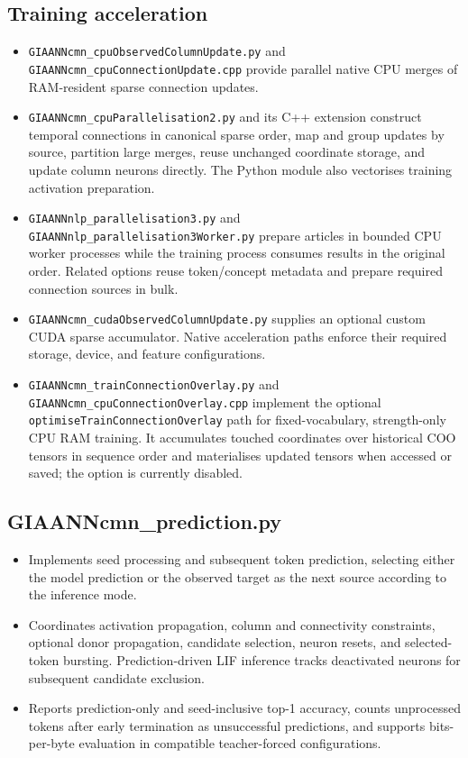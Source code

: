 \subsection{Training acceleration}
\begin{itemize}
	\item \texttt{GIAANNcmn\_cpuObservedColumnUpdate.py} and \texttt{GIAANNcmn\_cpuConnectionUpdate.cpp} provide parallel native CPU merges of RAM-resident sparse connection updates.
	\item \texttt{GIAANNcmn\_cpuParallelisation2.py} and its C++ extension construct temporal connections in canonical sparse order, map and group updates by source, partition large merges, reuse unchanged coordinate storage, and update column neurons directly. The Python module also vectorises training activation preparation.
	\item \texttt{GIAANNnlp\_parallelisation3.py} and \texttt{GIAANNnlp\_parallelisation3Worker.py} prepare articles in bounded CPU worker processes while the training process consumes results in the original order. Related options reuse token/concept metadata and prepare required connection sources in bulk.
	\item \texttt{GIAANNcmn\_cudaObservedColumnUpdate.py} supplies an optional custom CUDA sparse accumulator. Native acceleration paths enforce their required storage, device, and feature configurations.
	\item \texttt{GIAANNcmn\_trainConnectionOverlay.py} and \texttt{GIAANNcmn\_cpuConnectionOverlay.cpp} implement the optional \texttt{optimiseTrainConnectionOverlay} path for fixed-vocabulary, strength-only CPU RAM training. It accumulates touched coordinates over historical COO tensors in sequence order and materialises updated tensors when accessed or saved; the option is currently disabled.
\end{itemize}

\subsection{GIAANNcmn\_prediction.py}
\begin{itemize}
	\item Implements seed processing and subsequent token prediction, selecting either the model prediction or the observed target as the next source according to the inference mode.
	\item Coordinates activation propagation, column and connectivity constraints, optional donor propagation, candidate selection, neuron resets, and selected-token bursting. Prediction-driven LIF inference tracks deactivated neurons for subsequent candidate exclusion.
	\item Reports prediction-only and seed-inclusive top-1 accuracy, counts unprocessed tokens after early termination as unsuccessful predictions, and supports bits-per-byte evaluation in compatible teacher-forced configurations.
\end{itemize}

